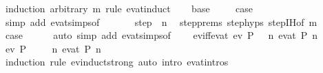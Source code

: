\begin{isabellebody}
%
\isadelimproof
%
\endisadelimproof
%
\isatagproof
{}\isamarkupfalse%
\ {\isacharparenleft}induction\ arbitrary{\isacharcolon}\ m\ rule{\isacharcolon}\ ev{\isacharunderscore}at{\isachardot}induct{\isacharparenright}\isanewline
\ \ \isamarkupfalse%
\ {\isacharparenleft}base\ {\isasymomega}{\isacharparenright}\ \isamarkupfalse%
\ \isamarkupfalse%
\ {\isacharquery}case\isanewline
\ \ \ \ \isamarkupfalse%
\ {\isacharparenleft}simp\ add{\isacharcolon}\ ev{\isacharunderscore}at{\isachardot}simps{\isacharbrackleft}of\ {\isacharunderscore}\ {\isacharunderscore}\ {\isasymomega}{\isacharbrackright}{\isacharparenright}\isanewline
{}\isamarkupfalse%
\isanewline
\ \ \isamarkupfalse%
\ {\isacharparenleft}step\ {\isasymomega}\ n{\isacharparenright}\ \isamarkupfalse%
\ step{\isachardot}prems\ step{\isachardot}hyps\ step{\isachardot}IH{\isacharbrackleft}of\ {\isachardoublequoteopen}m\ {\isacharminus}\ {}{\isachardoublequoteclose}{\isacharbrackright}\ \isamarkupfalse%
\ {\isacharquery}case\isanewline
\ \ \ \ \isamarkupfalse%
\ {\isacharparenleft}auto\ simp\ add{\isacharcolon}\ ev{\isacharunderscore}at{\isachardot}simps{\isacharbrackleft}of\ {\isacharunderscore}\ {\isacharunderscore}\ {\isasymomega}{\isacharbrackright}{\isacharparenright}\isanewline
{}\isamarkupfalse%
%
\endisatagproof
{\isafoldproof}%
%
\isadelimproof
\isanewline
%
\endisadelimproof
\isanewline
{}\isamarkupfalse%
\ ev{\isacharunderscore}iff{\isacharunderscore}ev{\isacharunderscore}at{\isacharcolon}\ {\isachardoublequoteopen}ev\ P\ {\isasymomega}\ {\isasymlongleftrightarrow}\ {\isacharparenleft}{\isasymexists}n{\isachardot}\ ev{\isacharunderscore}at\ P\ n\ {\isasymomega}{\isacharparenright}{\isachardoublequoteclose}\isanewline
%
\isadelimproof
%
\endisadelimproof
%
\isatagproof
{}\isamarkupfalse%
\isanewline
\ \ \isamarkupfalse%
\ {\isachardoublequoteopen}ev\ P\ {\isasymomega}{\isachardoublequoteclose}\ \isamarkupfalse%
\ \isamarkupfalse%
\ {\isachardoublequoteopen}{\isasymexists}n{\isachardot}\ ev{\isacharunderscore}at\ P\ n\ {\isasymomega}{\isachardoublequoteclose}\isanewline
\ \ \ \ \isamarkupfalse%
\ {\isacharparenleft}induction\ rule{\isacharcolon}\ ev{\isacharunderscore}induct{\isacharunderscore}strong{\isacharparenright}\ {\isacharparenleft}auto\ intro{\isacharcolon}\ ev{\isacharunderscore}at{\isachardot}intros{\isacharparenright}\isanewline

\end{isabellebody}

